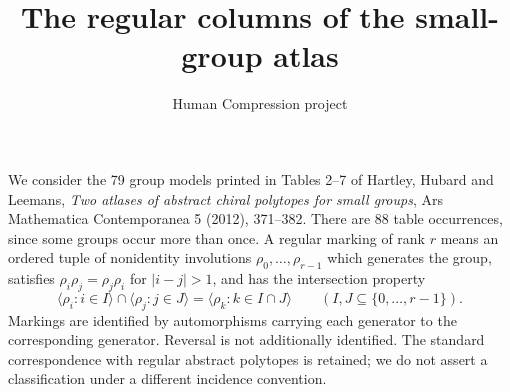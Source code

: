 \documentclass[10pt]{article}
\title{The regular columns of the small-group atlas}
\author{Human Compression project}\date{}
\begin{document}
\maketitle
We consider the 79 group models printed in Tables 2--7 of Hartley,
Hubard and Leemans, \emph{Two atlases of abstract chiral polytopes for
small groups}, Ars Mathematica Contemporanea 5 (2012), 371--382.
There are 88 table occurrences, since some groups occur more than once.
A regular marking of rank $r$ means an ordered tuple of nonidentity
involutions $\rho_0,\ldots,\rho_{r-1}$ which generates the group, satisfies
$\rho_i\rho_j=\rho_j\rho_i$ for $|i-j|>1$, and has the intersection property
\[
 \langle\rho_i:i\in I\rangle\cap\langle\rho_j:j\in J\rangle
 =\langle\rho_k:k\in I\cap J\rangle
 \qquad(I,J\subseteq\{0,\ldots,r-1\}).
\]
Markings are identified by automorphisms carrying each generator to the
corresponding generator. Reversal is not additionally identified. The
standard correspondence with regular abstract polytopes is retained;
we do not assert a classification under a different incidence convention.
\end{document}

